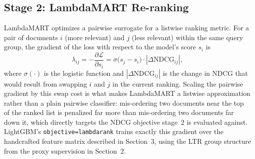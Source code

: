 \subsection{Stage 2: LambdaMART Re-ranking}
LambdaMART optimizes a pairwise surrogate for a listwise ranking metric.
For a pair of documents $i$ (more relevant) and $j$ (less relevant) within
the same query group, the gradient of the loss with respect to the model's
score $s_i$ is
\[
\lambda_{ij} = -\frac{\partial \mathcal{L}}{\partial s_i}
= \sigma\big(s_j - s_i\big)\cdot|\Delta\mathrm{NDCG}_{ij}|,
\]
where $\sigma(\cdot)$ is the logistic function and $|\Delta\mathrm{NDCG}_{ij}|$
is the change in NDCG that would result from swapping $i$ and $j$ in the
current ranking. Scaling the pairwise gradient by this swap cost is what
makes LambdaMART a listwise approximation rather than a plain pairwise
classifier: mis-ordering two documents near the top of the ranked list is
penalized far more than mis-ordering two documents far down it, which
directly targets the NDCG objective stage~2 is evaluated against. LightGBM's
\texttt{objective=lambdarank} trains exactly this gradient over the
handcrafted feature matrix described in Section~3, using the LTR group
structure from the proxy supervision in Section~2.
